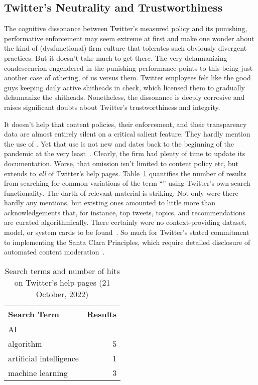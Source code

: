 \subsection{Twitter's Neutrality and Trustworthiness}
\label{sec:trusting-twitter}

The cognitive dissonance between Twitter's measured policy and its punishing,
performative enforcement may seem extreme at first and make one wonder about the
kind of (dysfunctional) firm culture that tolerates such obviously divergent
practices. But it doesn't take much to get there. The very dehumanizing
condescencion engendered in the punishing performance points to this being just
another case of othering, of us versus them. Twitter employees felt like the
good guys keeping daily active shitheads in check, which licensed them to
gradually dehumanize the shitheads. Nonetheless, the dissonance is deeply
corrosive and raises significant doubts about Twitter's trustworthiness and
integrity.

It doesn't help that content policies, their enforcement, and their transparency
data are almost entirely silent on a critical salient feature. They hardly
mention the use of . Yet that use is not new and dates back to the
beginning of the pandemic at the very least~\cite{ScottKayali2020}. Clearly, the
firm had plenty of time to update its documentation. Worse, that omission isn't
limited to content policy etc, but extends to \emph{all} of Twitter's help
pages. Table~\ref{table:search} quantifies the number of results from searching
for common variations of the term ``'' using Twitter's own search
functionality. The darth of relevant material is striking. Not only were there
hardly any mentions, but existing ones amounted to little more than
acknowledgements that, for instance, top tweets, topics, and recommendations are
curated algorithmically. There certainly were no context-providing dataset,
model, or system cards to be
found~\cite{GebruMorgensternea2021,MitchellWuea2019,ProcopeCheemaea2022}. So
much for Twitter's stated commitment to
implementing the Santa Clara Principles, which require detailed disclosure of
automated content
moderation~\cite{AccessNowACLUFoundationOfNorthernCaliforniaea2021}.

\begin{table}
\caption{Search terms and number of hits on Twitter's help pages (21 October, 2022)}
\label{table:search}
\begin{tabular}{lr}
\textbf{Search Term} & \textbf{Results} \B \\ \hline
AI & \T0 \\
algorithm & 5 \\
artificial intelligence & 1 \\
machine learning & 3 \\
\end{tabular}
\end{table}

